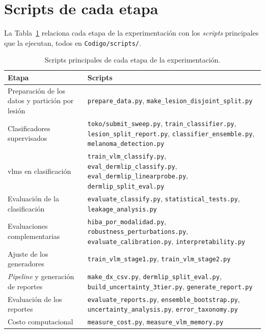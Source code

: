 \section{Scripts de cada etapa}
\label{sec:ap_scripts}

La Tabla~\ref{tab:ap_scripts} relaciona cada etapa de la experimentación con los \emph{scripts} principales que la
ejecutan, todos en \texttt{Codigo/scripts/}.

\begin{table}[H]
    \centering
    \caption{Scripts principales de cada etapa de la experimentación.}
    \label{tab:ap_scripts}
    \small
    \begin{tabularx}{\textwidth}{@{}>{\raggedright\arraybackslash}p{4.6cm}>{\raggedright\arraybackslash}X@{}}
        \toprule
        \textbf{Etapa} & \textbf{Scripts} \\
        \midrule
        Preparación de los datos y partición por lesión & \texttt{prepare\_data.py},
            \texttt{make\_lesion\_disjoint\_split.py} \\
        \filasep
        Clasificadores supervisados & \texttt{toko/submit\_sweep.py}, \texttt{train\_classifier.py},
            \texttt{lesion\_split\_report.py}, \texttt{classifier\_ensemble.py}, \texttt{melanoma\_detection.py} \\
        \filasep
        \glspl{vlm} en clasificación & \texttt{train\_vlm\_classify.py}, \texttt{eval\_dermlip\_classify.py},
            \texttt{eval\_dermlip\_linearprobe.py}, \texttt{dermlip\_split\_eval.py} \\
        \filasep
        Evaluación de la clasificación & \texttt{evaluate\_classify.py}, \texttt{statistical\_tests.py},
            \texttt{leakage\_analysis.py} \\
        \filasep
        Evaluaciones complementarias & \texttt{hiba\_por\_modalidad.py}, \texttt{robustness\_perturbations.py},
            \texttt{evaluate\_calibration.py}, \texttt{interpretability.py} \\
        \filasep
        Ajuste de los generadores & \texttt{train\_vlm\_stage1.py}, \texttt{train\_vlm\_stage2.py} \\
        \filasep
        \emph{Pipeline} y generación de reportes & \texttt{make\_dx\_csv.py}, \texttt{dermlip\_split\_eval.py},
            \texttt{build\_uncertainty\_3tier.py}, \texttt{generate\_report.py} \\
        \filasep
        Evaluación de los reportes & \texttt{evaluate\_reports.py}, \texttt{ensemble\_bootstrap.py},
            \texttt{uncertainty\_analysis.py}, \texttt{error\_taxonomy.py} \\
        \filasep
        Costo computacional & \texttt{measure\_cost.py}, \texttt{measure\_vlm\_memory.py} \\
        \bottomrule
    \end{tabularx}
\end{table}

